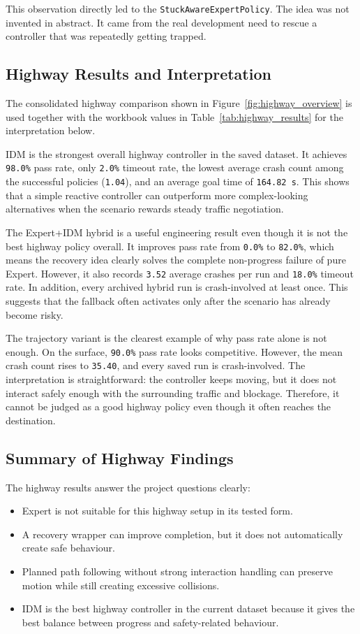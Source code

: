 \documentclass[12pt,a4paper]{report}
\begin{document}
This observation directly led to the \texttt{StuckAwareExpertPolicy}. The idea was not invented in abstract. It came from the real development need to rescue a controller that was repeatedly getting trapped.

\subsection{Highway Results and Interpretation}
The consolidated highway comparison shown in Figure~\ref{fig:highway_overview} is used together with the workbook values in Table~\ref{tab:highway_results} for the interpretation below.

IDM is the strongest overall highway controller in the saved dataset. It achieves \texttt{98.0\%} pass rate, only \texttt{2.0\%} timeout rate, the lowest average crash count among the successful policies (\texttt{1.04}), and an average goal time of \texttt{164.82 s}. This shows that a simple reactive controller can outperform more complex-looking alternatives when the scenario rewards steady traffic negotiation.

The Expert+IDM hybrid is a useful engineering result even though it is not the best highway policy overall. It improves pass rate from \texttt{0.0\%} to \texttt{82.0\%}, which means the recovery idea clearly solves the complete non-progress failure of pure Expert. However, it also records \texttt{3.52} average crashes per run and \texttt{18.0\%} timeout rate. In addition, every archived hybrid run is crash-involved at least once. This suggests that the fallback often activates only after the scenario has already become risky.

The trajectory variant is the clearest example of why pass rate alone is not enough. On the surface, \texttt{90.0\%} pass rate looks competitive. However, the mean crash count rises to \texttt{35.40}, and every saved run is crash-involved. The interpretation is straightforward: the controller keeps moving, but it does not interact safely enough with the surrounding traffic and blockage. Therefore, it cannot be judged as a good highway policy even though it often reaches the destination.

\subsection{Summary of Highway Findings}
The highway results answer the project questions clearly:

\begin{itemize}
    \item Expert is not suitable for this highway setup in its tested form.
    \item A recovery wrapper can improve completion, but it does not automatically create safe behaviour.
    \item Planned path following without strong interaction handling can preserve motion while still creating excessive collisions.
    \item IDM is the best highway controller in the current dataset because it gives the best balance between progress and safety-related behaviour.
\end{itemize}
\end{document}
